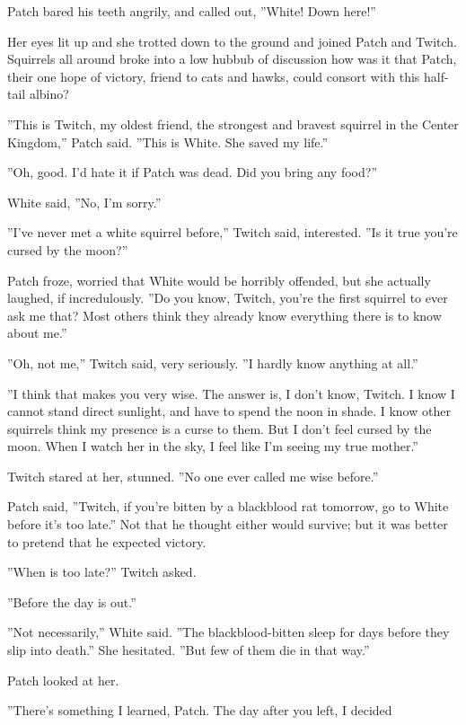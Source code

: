 \documentclass[12pt]{book}
\begin{document}
 Patch bared his teeth angrily, and called out, ''White! Down here!''\par
 Her eyes lit up and she trotted down to the ground and joined Patch and Twitch. Squirrels all around broke into a low hubbub of discussion %
 how was it that Patch, their one hope of victory, friend to cats and hawks, could consort with this half-tail albino?\par
 ''This is Twitch, my oldest friend, the strongest and bravest squirrel in the Center Kingdom,'' Patch said. ''This is White. She saved my life.''\par
 ''Oh, good. I'd hate it if Patch was dead. Did you bring any food?''\par
 White said, ''No, I'm sorry.''\par
 ''I've never met a white squirrel before,'' Twitch said, interested. ''Is it true you're cursed by the moon?''\par
 Patch froze, worried that White would be horribly offended, but she actually laughed, if incredulously. ''Do you know, Twitch, you're the first squirrel to ever ask me that? Most others think they already know everything there is to know about me.''\par
 ''Oh, not me,'' Twitch said, very seriously. ''I hardly know anything at all.''\par
 ''I think that makes you very wise. The answer is, I don't know, Twitch. I know I cannot stand direct sunlight, and have to spend the noon in shade. I know other squirrels think my presence is a curse to them. But I don't feel cursed by the moon. When I watch her in the sky, I feel like I'm seeing my true mother.''\par
 Twitch stared at her, stunned. ''No one ever called me wise before.''\par
 Patch said, ''Twitch, if you're bitten by a blackblood rat tomorrow, go to White before it's too late.'' Not that he thought either would survive; but it was better to pretend that he expected victory.\par
 ''When is too late?'' Twitch asked.\par
 ''Before the day is out.''\par
 ''Not necessarily,'' White said. ''The blackblood-bitten sleep for days before they slip into death.'' She hesitated. ''But few of them die in that way.''\par
 Patch looked at her.\par
 ''There's something I learned, Patch. The day after you left, I decided %
\end{document}
